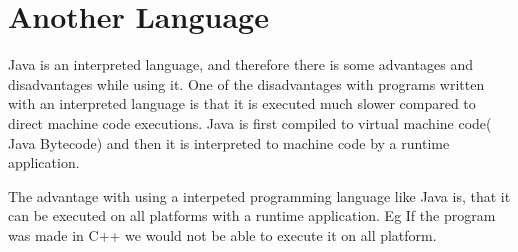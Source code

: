 \section{Another Language}
Java is an interpreted language, and therefore there is some advantages and disadvantages while using it. One of the disadvantages with programs written with an interpreted language is that it is executed much slower compared to direct machine code executions. Java is first compiled to virtual machine code( Java Bytecode) and then it is interpreted to machine code by a runtime application.

The advantage with using a interpeted programming language like Java is, that it can be executed on all platforms with a runtime application. Eg If the program was made in C++ we would not be able to execute it on all platform.